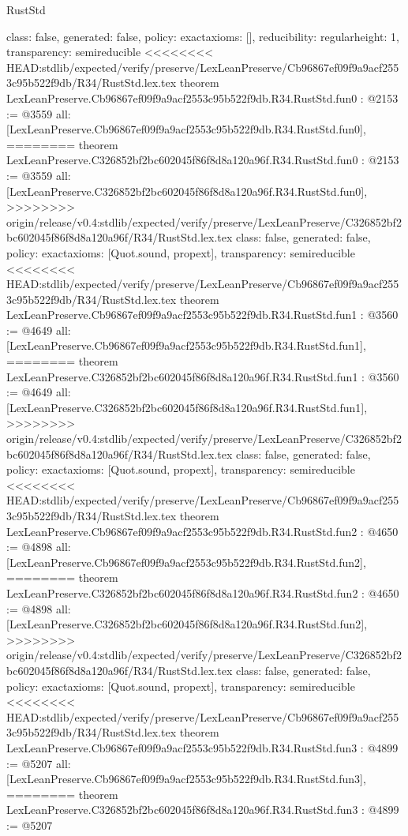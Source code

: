 \begin{lexlean}{RustStd}
\begin{coremodule}
{\begin{coremodule}
{{{  class: false,
  generated: false,
  policy: exact{axioms: []},
  reducibility: regular{height: 1},
  transparency: semireducible
}
<<<<<<<< HEAD:stdlib/expected/verify/preserve/LexLeanPreserve/Cb96867ef09f9a9acf2553c95b522f9db/R34/RustStd.lex.tex
theorem LexLeanPreserve.Cb96867ef09f9a9acf2553c95b522f9db.R34.RustStd.fun0 : @2153 := @3559 {
  all: [LexLeanPreserve.Cb96867ef09f9a9acf2553c95b522f9db.R34.RustStd.fun0],
========
theorem LexLeanPreserve.C326852bf2bc602045f86f8d8a120a96f.R34.RustStd.fun0 : @2153 := @3559 {
  all: [LexLeanPreserve.C326852bf2bc602045f86f8d8a120a96f.R34.RustStd.fun0],
>>>>>>>> origin/release/v0.4:stdlib/expected/verify/preserve/LexLeanPreserve/C326852bf2bc602045f86f8d8a120a96f/R34/RustStd.lex.tex
  class: false,
  generated: false,
  policy: exact{axioms: [Quot.sound, propext]},
  transparency: semireducible
}
<<<<<<<< HEAD:stdlib/expected/verify/preserve/LexLeanPreserve/Cb96867ef09f9a9acf2553c95b522f9db/R34/RustStd.lex.tex
theorem LexLeanPreserve.Cb96867ef09f9a9acf2553c95b522f9db.R34.RustStd.fun1 : @3560 := @4649 {
  all: [LexLeanPreserve.Cb96867ef09f9a9acf2553c95b522f9db.R34.RustStd.fun1],
========
theorem LexLeanPreserve.C326852bf2bc602045f86f8d8a120a96f.R34.RustStd.fun1 : @3560 := @4649 {
  all: [LexLeanPreserve.C326852bf2bc602045f86f8d8a120a96f.R34.RustStd.fun1],
>>>>>>>> origin/release/v0.4:stdlib/expected/verify/preserve/LexLeanPreserve/C326852bf2bc602045f86f8d8a120a96f/R34/RustStd.lex.tex
  class: false,
  generated: false,
  policy: exact{axioms: [Quot.sound, propext]},
  transparency: semireducible
}
<<<<<<<< HEAD:stdlib/expected/verify/preserve/LexLeanPreserve/Cb96867ef09f9a9acf2553c95b522f9db/R34/RustStd.lex.tex
theorem LexLeanPreserve.Cb96867ef09f9a9acf2553c95b522f9db.R34.RustStd.fun2 : @4650 := @4898 {
  all: [LexLeanPreserve.Cb96867ef09f9a9acf2553c95b522f9db.R34.RustStd.fun2],
========
theorem LexLeanPreserve.C326852bf2bc602045f86f8d8a120a96f.R34.RustStd.fun2 : @4650 := @4898 {
  all: [LexLeanPreserve.C326852bf2bc602045f86f8d8a120a96f.R34.RustStd.fun2],
>>>>>>>> origin/release/v0.4:stdlib/expected/verify/preserve/LexLeanPreserve/C326852bf2bc602045f86f8d8a120a96f/R34/RustStd.lex.tex
  class: false,
  generated: false,
  policy: exact{axioms: [Quot.sound, propext]},
  transparency: semireducible
}
<<<<<<<< HEAD:stdlib/expected/verify/preserve/LexLeanPreserve/Cb96867ef09f9a9acf2553c95b522f9db/R34/RustStd.lex.tex
theorem LexLeanPreserve.Cb96867ef09f9a9acf2553c95b522f9db.R34.RustStd.fun3 : @4899 := @5207 {
  all: [LexLeanPreserve.Cb96867ef09f9a9acf2553c95b522f9db.R34.RustStd.fun3],
========
theorem LexLeanPreserve.C326852bf2bc602045f86f8d8a120a96f.R34.RustStd.fun3 : @4899 := @5207 {
}}}}}}}
\end{coremodule}}
\end{coremodule}
\end{lexlean}
